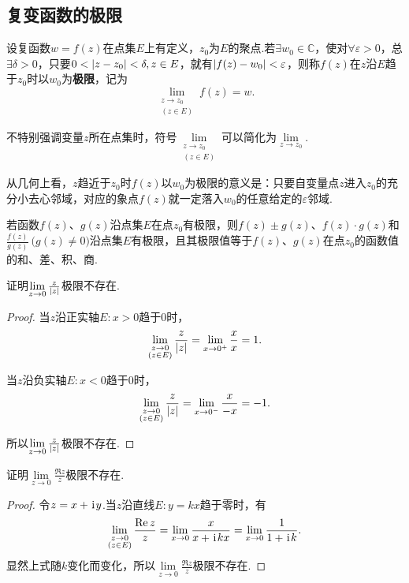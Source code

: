 \subsection{复变函数的极限}
\begin{definition}
设复函数\(w=f(z)\)在点集\(E\)上有定义，\(z_0\)为\(E\)的聚点.若\(\exists w_0 \in \mathbb{C}\)，使对\(\forall \varepsilon > 0\)，总\(\exists \delta > 0\)，只要\(0<\abs{z-z_0}<\delta, z \in E\)，就有\(\abs{f(z)-w_0} < \varepsilon\)，则称\(f(z)\)在\(z\)沿\(E\)趋于\(z_0\)时以\(w_0\)为\textbf{极限}，记为\[
\lim\limits_{\substack{z \to z_0 \\ (z \in E)}} f(z) = w.
\]

不特别强调变量\(z\)所在点集时，符号\(\lim\limits_{\substack{z \to z_0 \\ (z \in E)}}\)可以简化为\(\lim\limits_{z \to z_0}\).
\end{definition}
从几何上看，\(z\)趋近于\(z_0\)时\(f(z)\)以\(w_0\)为极限的意义是：只要自变量点\(z\)进入\(z_0\)的充分小去心邻域，对应的象点\(f(z)\)就一定落入\(w_0\)的任意给定的\(\varepsilon\)邻域.

\begin{theorem}
若函数\(f(z)\)、\(g(z)\)沿点集\(E\)在点\(z_0\)有极限，则\(f(z) \pm g(z)\)、\(f(z) \cdot g(z)\)和\(\frac{f(z)}{g(z)}\ \bigl(g(z) \neq 0\bigr)\)沿点集\(E\)有极限，且其极限值等于\(f(z)\)、\(g(z)\)在点\(z_0\)的函数值的和、差、积、商.
\end{theorem}

\begin{example}
证明\(\lim\limits_{z\to0} \frac{z}{\abs{z}}\)极限不存在.
\begin{proof}
当\(z\)沿正实轴\(E: x > 0\)趋于0时，\[
\lim\limits_{\substack{z\to0 \\ (z \in E)}} \frac{z}{\abs{z}}
= \lim\limits_{x\to0^+} \frac{x}{x} = 1.
\]

当\(z\)沿负实轴\(E: x < 0\)趋于0时，\[
\lim\limits_{\substack{z\to0 \\ (z \in E)}} \frac{z}{\abs{z}}
= \lim\limits_{x\to0^-} \frac{x}{-x} = -1.
\]

所以\(\lim\limits_{z\to0} \frac{z}{\abs{z}}\)极限不存在.
\end{proof}
\end{example}

\begin{example}
证明\(\lim\limits_{z\to0} \frac{\Re z}{z}\)极限不存在.
\begin{proof}
令\(z = x + \kern1pt\mathrm{i}\kern1pt y\).当\(z\)沿直线\(E: y = kx\)趋于零时，有\[
\lim\limits_{\substack{z\to0 \\ (z \in E)}} \frac{\Re z}{z}
= \lim\limits_{x\to0} \frac{x}{x + \kern1pt\mathrm{i}\kern1pt kx}
= \lim\limits_{x\to0} \frac{1}{1+\kern1pt\mathrm{i}\kern1pt k}.
\]显然上式随\(k\)变化而变化，所以\(\lim\limits_{z\to0} \frac{\Re z}{z}\)极限不存在.
\end{proof}
\end{example}

